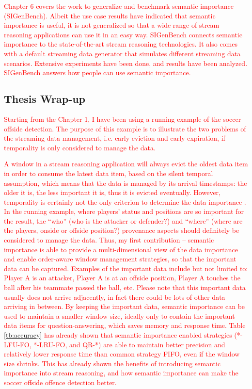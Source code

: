 \textcolor{red}{
Chapter 6 covers the work to generalize and benchmark semantic importance (SIGenBench).
Albeit the use case results have indicated that semantic importance is useful, it is not generalized so that a wide range of stream reasoning applications can use it in an easy way.
SIGenBench connects semantic importance to the state-of-the-art stream reasoning technologies.
It also comes with a default streaming data generator that simulates different streaming data scenarios. 
Extensive experiments have been done, and results have been analyzed. 
SIGenBench answers how people can use semantic importance.
}
%
\subsection{Thesis Wrap-up}
\textcolor{red}{
Starting from the Chapter 1, I have been using a running example of the soccer offside detection.
The purpose of this example is to illustrate the two problems of the streaming data management, i.e. early eviction and early expiration, if temporality is only considered to manage the data.
}

\textcolor{red}{
A window in a stream reasoning application will always evict the oldest data item in order to consume the latest data item, based on the silent temporal assumption, which means that the data is managed by its arrival timestamps: the older it is, the less important it is, thus it is evicted eventually. 
However, temporality is certainly not the only criterion to determine the data importance . 
In the running example, where players' status and positions are so important for the result, the ``who'' (who is
the attacker or defender?) and ``where'' (where are the players, onside or offside position?) provenance aspects should definitely be considered to manage the data. 
Thus, my first contribution -- semantic importance is able to provide a multi-dimensional view of the data importance and enable order-aware window management strategies, so that the important data can be captured.
Examples of the important data include but not limited to: Player A is an attacker, Player A is at an offside position, Player A touches the ball after his teammate passed the ball, etc. 
Please note that this important data usually does not arrive adjacently, in fact there could be lots of other data arriving in between.
By keeping the important data, semantic importance can be used to maintain a smaller window size, ideally only to contain the important data items for question-answering, which saves memory and response time.
Table \ref{tb:accuracy} has already shown that semantic importance enabled strategies (*-LFU-FO, *-LRU-FO, and QR-*) are able to maintain better precision and relatively lower response time than common strategy FIFO, even if the window size shrinks.
This has already shown the benefits of introducing semantic importance into stream reasoning, and how semantic importance can make the soccer offside offence detection better.
}

